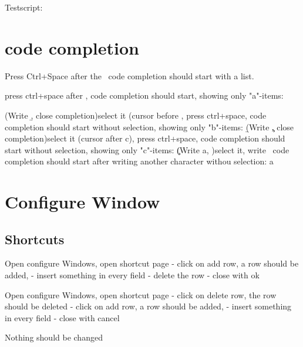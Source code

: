 Testscript:

\section{code completion}

Press Ctrl+Space after the \, code completion should start with a list. 
\

press ctrl+space after \a, code completion should start, showing only "a"-items:
\a


(Write \b, close completion)select it (cursor before \), press ctrl+space, code completion should start without selection, showing only "b"-items:
\b

(Write \c, close completion)select it (cursor after c), press ctrl+space, code completion should start without selection, showing only "c"-items:
\c

(Write a, )select it, write \, code completion should start after writing another character withou selection:
a

\section{Configure Window}
\subsection{Shortcuts}
Open configure Windows, open shortcut page
   - click on add row, a row should be added, 
   - insert something in every field
   - delete the row
   - close with ok

Open configure Windows, open shortcut page
   - click on delete row, the row should be deleted
   - click on add row, a row should be added, 
   - insert something in every field
   - close with cancel
   
Nothing should be changed

